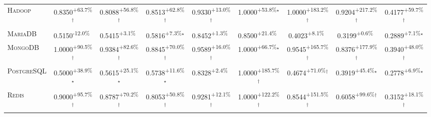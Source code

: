 \begin{table}[htbp]
\begin{tabular}{l|cccc|cccc}
\textsc{Hadoop} & \cellcolor{green!30}0.8350\textsuperscript{+63.7\%}$^\dagger$ & \cellcolor{green!30}0.8088\textsuperscript{+56.8\%}$^\dagger$ & \cellcolor{green!30}0.8513\textsuperscript{+62.8\%}$^\dagger$ & \cellcolor{green!30}0.9330\textsuperscript{+13.0\%}$^\dagger$ & \cellcolor{green!30}1.0000\textsuperscript{+53.8\%}$^\star$ & \cellcolor{green!30}1.0000\textsuperscript{+183.2\%}$^\dagger$ & \cellcolor{green!30}0.9204\textsuperscript{+217.2\%}$^\dagger$ & \cellcolor{green!30}0.4177\textsuperscript{+59.7\%}$^\dagger$ \\
\textsc{MariaDB} & \cellcolor{red!30}0.5150\textsuperscript{-12.0\%}$^{\,\,\,}$ & \cellcolor{green!30}0.5415\textsuperscript{+3.1\%}$^{\,\,\,}$ & \cellcolor{green!30}0.5816\textsuperscript{+7.3\%}$^\star$ & \cellcolor{green!30}0.8452\textsuperscript{+1.3\%}$^{\,\,\,}$ & \cellcolor{green!30}0.8500\textsuperscript{+21.4\%}$^{\,\,\,}$ & \cellcolor{green!30}0.4023\textsuperscript{+8.1\%}$^{\,\,\,}$ & \cellcolor{green!30}0.3199\textsuperscript{+0.6\%}$^{\,\,\,}$ & \cellcolor{green!30}0.2889\textsuperscript{+7.1\%}$^\star$ \\
\textsc{MongoDB} & \cellcolor{green!30}1.0000\textsuperscript{+90.5\%}$^\dagger$ & \cellcolor{green!30}0.9384\textsuperscript{+82.6\%}$^\dagger$ & \cellcolor{green!30}0.8845\textsuperscript{+70.0\%}$^\dagger$ & \cellcolor{green!30}0.9589\textsuperscript{+16.0\%}$^\dagger$ & \cellcolor{green!30}1.0000\textsuperscript{+66.7\%}$^\star$ & \cellcolor{green!30}0.9545\textsuperscript{+165.7\%}$^\dagger$ & \cellcolor{green!30}0.8376\textsuperscript{+177.9\%}$^\dagger$ & \cellcolor{green!30}0.3940\textsuperscript{+48.0\%}$^\dagger$ \\
\textsc{PostgreSQL} & \cellcolor{green!30}0.5000\textsuperscript{+38.9\%}$^\star$ & \cellcolor{green!30}0.5615\textsuperscript{+25.1\%}$^\star$ & \cellcolor{green!30}0.5738\textsuperscript{+11.6\%}$^\star$ & \cellcolor{green!30}0.8328\textsuperscript{+2.4\%}$^{\,\,\,}$ & \cellcolor{green!30}1.0000\textsuperscript{+185.7\%}$^\dagger$ & \cellcolor{green!30}0.4674\textsuperscript{+71.0\%}$^\dagger$ & \cellcolor{green!30}0.3919\textsuperscript{+45.4\%}$^\star$ & \cellcolor{green!30}0.2778\textsuperscript{+6.9\%}$^\star$ \\
\textsc{Redis} & \cellcolor{green!30}0.9000\textsuperscript{+95.7\%}$^\dagger$ & \cellcolor{green!30}0.8787\textsuperscript{+70.2\%}$^\dagger$ & \cellcolor{green!30}0.8053\textsuperscript{+50.8\%}$^\dagger$ & \cellcolor{green!30}0.9281\textsuperscript{+12.1\%}$^\dagger$ & \cellcolor{green!30}1.0000\textsuperscript{+122.2\%}$^\dagger$ & \cellcolor{green!30}0.8544\textsuperscript{+151.5\%}$^\dagger$ & \cellcolor{green!30}0.6058\textsuperscript{+99.6\%}$^\dagger$ & \cellcolor{green!30}0.3152\textsuperscript{+18.1\%}$^\dagger$ \\

\end{tabular}
\end{table}
